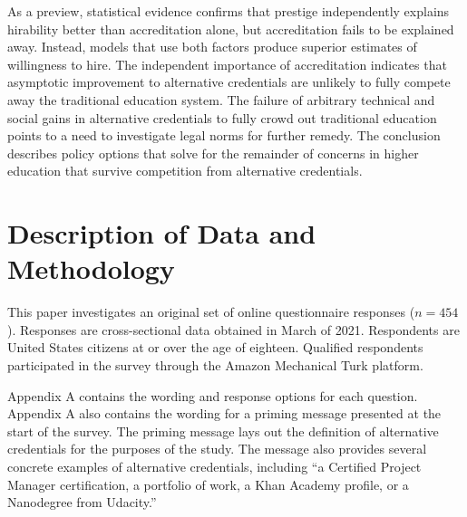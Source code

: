 \documentclass[review]{elsarticle}
\begin{document}

As a preview, statistical evidence confirms that prestige independently explains hirability better than accreditation alone,
but accreditation fails to be explained away.
Instead, models that use both factors produce superior estimates of willingness to hire.
The independent importance of accreditation indicates that asymptotic improvement to alternative credentials
are unlikely to fully compete away the traditional education system.
The failure of arbitrary technical and social gains in alternative credentials to fully crowd out traditional education
points to a need to investigate legal norms for further remedy.
The conclusion describes policy options that solve for the remainder of concerns in higher education that survive competition from alternative credentials.

\section{Description of Data and Methodology}

This paper investigates an original set of online questionnaire responses ($n = 454$).
Responses are cross-sectional data obtained in March of 2021.
Respondents are United States citizens at or over the age of eighteen.
Qualified respondents participated in the survey through the Amazon Mechanical Turk platform.

Appendix A contains the wording and response options for each question.
Appendix A also contains the wording for a priming message presented at the start of the survey.
The priming message lays out the definition of alternative credentials for the purposes of the study.
The message also provides several concrete examples of alternative credentials,
including ``a Certified Project Manager certification,
a portfolio of work, a Khan Academy profile, or a Nanodegree from Udacity.''
\end{document}
